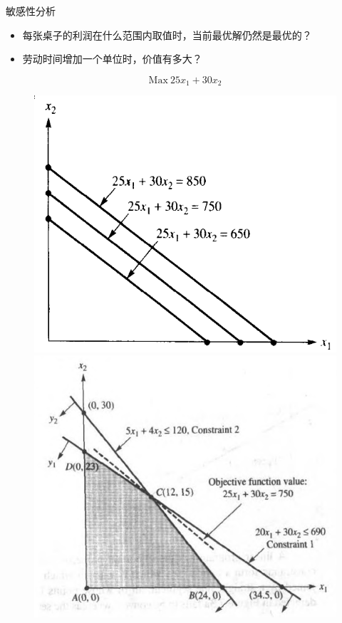 \documentclass[mathserif, table]{beamer}
\begin{document}
\begin{frame}{敏感性分析}
  \begin{itemize}
  \item 每张桌子的利润在什么范围内取值时，当前最优解仍然是最优的？
  \item 劳动时间增加一个单位时，价值有多大？
  \end{itemize}
  \[
  \mbox{Max}\ 25x_1 + 30x_2
  \]

  \begin{figure}
    \begin{minipage}{.5\linewidth}
      \includegraphics[width=\textwidth{}]{level.png}
    \end{minipage}%
    \begin{minipage}{.5\linewidth}
      \includegraphics[width=\textwidth{}]{wood.png}
    \end{minipage}
  \end{figure}  

\end{frame}
\end{document}
